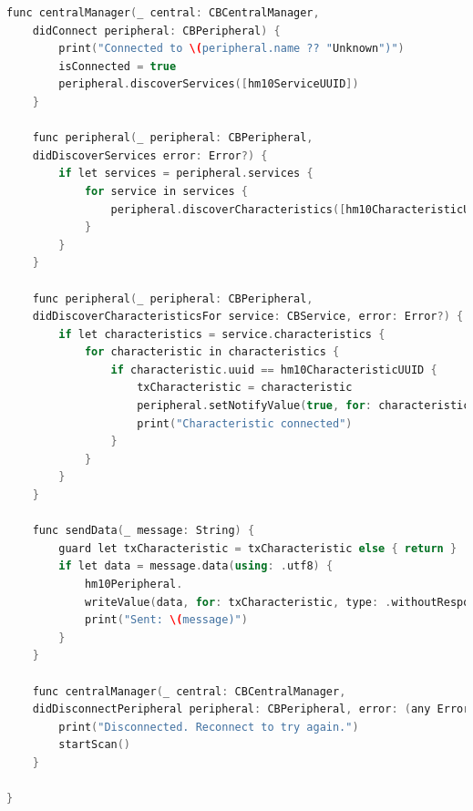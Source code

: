 \begin{lstlisting}[language=c++]
    func centralManager(_ central: CBCentralManager,
    didConnect peripheral: CBPeripheral) {
        print("Connected to \(peripheral.name ?? "Unknown")")
        isConnected = true
        peripheral.discoverServices([hm10ServiceUUID])
    }

    func peripheral(_ peripheral: CBPeripheral,
    didDiscoverServices error: Error?) {
        if let services = peripheral.services {
            for service in services {
                peripheral.discoverCharacteristics([hm10CharacteristicUUID], for: service)
            }
        }
    }

    func peripheral(_ peripheral: CBPeripheral,
    didDiscoverCharacteristicsFor service: CBService, error: Error?) {
        if let characteristics = service.characteristics {
            for characteristic in characteristics {
                if characteristic.uuid == hm10CharacteristicUUID {
                    txCharacteristic = characteristic
                    peripheral.setNotifyValue(true, for: characteristic)
                    print("Characteristic connected")
                }
            }
        }
    }

    func sendData(_ message: String) {
        guard let txCharacteristic = txCharacteristic else { return }
        if let data = message.data(using: .utf8) {
            hm10Peripheral.
            writeValue(data, for: txCharacteristic, type: .withoutResponse)
            print("Sent: \(message)")
        }
    }
    
    func centralManager(_ central: CBCentralManager,
    didDisconnectPeripheral peripheral: CBPeripheral, error: (any Error)?) {
        print("Disconnected. Reconnect to try again.")
        startScan()
    }

}



\end{lstlisting}
